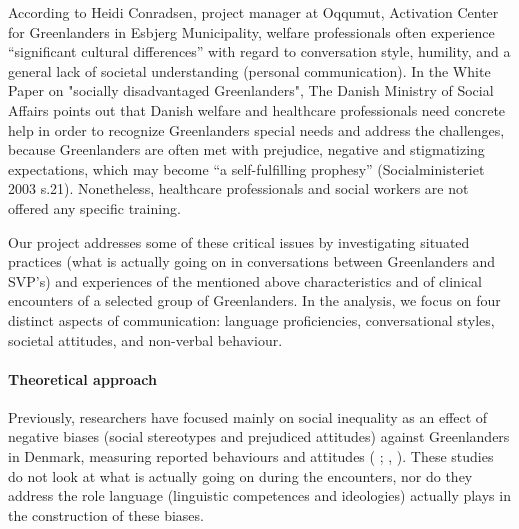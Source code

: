 \documentclass[twocolumn, serif, rga, authordate]{jote-article}
\begin{document}
According to Heidi Conradsen, project manager at Oqqumut, Activation Center for Greenlanders in Esbjerg Municipality, welfare professionals often experience ``significant cultural differences'' with regard to conversation style, humility, and a general lack of societal understanding (personal communication). In the White Paper on "socially disadvantaged Greenlanders", The Danish Ministry of Social Affairs points out that Danish welfare and healthcare professionals need concrete help in order to recognize Greenlanders special needs and address the challenges, because Greenlanders are often met with prejudice, negative and stigmatizing expectations, which may become ``a self-fulfilling prophesy'' (Socialministeriet 2003 s.21). Nonetheless, healthcare professionals and social workers are not offered any specific training.

Our project addresses some of these critical issues by investigating situated practices (what is actually going on in conversations between Greenlanders and SVP's) and experiences of the mentioned above characteristics and of clinical encounters of a selected group of Greenlanders. In the analysis, we focus on four distinct aspects of communication: language proficiencies, conversational styles, societal attitudes, and non-verbal behaviour.


\paragraph{Theoretical approach}


Previously, researchers have focused mainly on social inequality as an effect of negative biases (social stereotypes and prejudiced attitudes)
against Greenlanders in Denmark, measuring reported behaviours and attitudes ( \citeyear{Togeby2004}; , \citeyear{laage-petersen2015}).
These studies do not look at what is actually going on during the encounters, nor do they address the role language (linguistic competences and ideologies) actually plays in the construction of these biases.
\end{document}
